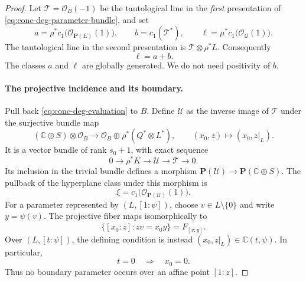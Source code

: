 \begin{proof}
Let $\mathcal{T}=\mathcal{O}_B(-1)$ be the tautological line in the \emph{first} presentation of \eqref{eq:conc-deg-parameter-bundle}, and set
\[
 a=\rho^*c_1\bigl(\mathcal{O}_{\mathbf{P}(E)}(1)\bigr),
 \qquad b=c_1(\mathcal{T}^*),
 \qquad \ell=\mu^*c_1\bigl(\mathcal{O}_{\mathcal{Q}}(1)\bigr).
\]
The tautological line in the second presentation is $\mathcal{T}\otimes\rho^*L$.  Consequently
\begin{equation}
 \ell=a+b.
 \label{eq:conc-deg-hyperplane}
\end{equation}
The classes $a$ and $\ell$ are globally generated.  We do not need positivity of $b$.

\paragraph{The projective incidence and its boundary.}
Pull back \eqref{eq:conc-deg-evaluation} to $B$.  Define $\mathcal{U}$ as the inverse image of $\mathcal{T}$ under the surjective bundle map
\[
 (\mathbb{C}\oplus S)\otimes\mathcal{O}_B
 \longrightarrow
 \mathcal{O}_B\oplus\rho^*(Q^*\otimes L^*),
 \qquad (x_0,z)\longmapsto(x_0,z|_L).
\]
It is a vector bundle of rank $s_0+1$, with exact sequence
\begin{equation}
 0\longrightarrow\rho^*K\longrightarrow\mathcal{U}
 \longrightarrow\mathcal{T}\longrightarrow0.
 \label{eq:conc-deg-incidence-bundle}
\end{equation}
Its inclusion in the trivial bundle defines a morphism $\mathbf{P}(\mathcal{U})\to\mathbf{P}(\mathbb{C}\oplus S)$. The pullback of the hyperplane class under this morphism is
\[
 \xi=c_1\bigl(\mathcal{O}_{\mathbf{P}(\mathcal{U})}(1)\bigr).
\]
For a parameter represented by $(L,[1:\psi])$, choose $v\in L\setminus\{0\}$ and write $y=\psi(v)$. The projective fiber maps isomorphically to
\begin{equation}
 \{[x_0:z]:zv=x_0y\}=\overline{F_{[v:y]}}.
 \label{eq:conc-deg-flat-closure}
\end{equation}
Over $(L,[t:\psi])$, the defining condition is instead $(x_0,z|_L)\in\mathbb{C}(t,\psi)$.  In particular,
\begin{equation}
 t=0\quad\Longrightarrow\quad x_0=0.
 \label{eq:conc-deg-boundary}
\end{equation}
Thus no boundary parameter occurs over an affine point $[1:z]$.


\end{proof}
